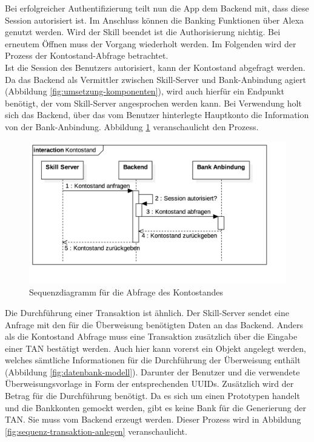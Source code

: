 Bei erfolgreicher Authentifizierung teilt nun die App dem Backend mit, dass diese Session autorisiert ist. Im Anschluss können die Banking Funktionen über Alexa genutzt werden. Wird der Skill beendet ist die Authorisierung nichtig. Bei erneutem Öffnen muss der Vorgang wiederholt werden. Im Folgenden wird der Prozess der Kontostand-Abfrage betrachtet.\\
Ist die Session des Benutzers autorisiert, kann der Kontostand abgefragt werden. Da das Backend als Vermittler zwischen Skill-Server und Bank-Anbindung agiert (\vgl Abbildung \ref{fig:umsetzung-komponenten}), wird auch hierfür ein Endpunkt benötigt, der vom Skill-Server angesprochen werden kann. Bei Verwendung holt sich das Backend, über das vom Benutzer hinterlegte Hauptkonto die Information von der Bank-Anbindung. Abbildung \ref{fig:sequenz-kontostand} veranschaulicht den Prozess.\newpage

\begin{figure}[!htb]
    \centering
    \includegraphics[width=1.0\textwidth]{bilder/4_sequenzKontostand.png}
    \caption{Sequenzdiagramm für die Abfrage des Kontostandes}
    \label{fig:sequenz-kontostand}
\end{figure}

Die Durchführung einer Transaktion ist ähnlich. Der Skill-Server sendet eine Anfrage mit den für die Überweisung benötigten Daten an das Backend. Anders als die Kontostand Abfrage muss eine Transaktion zusätzlich über die Eingabe einer \ac{TAN} bestätigt werden. Auch hier kann vorerst ein Objekt angelegt werden, welches sämtliche Informationen für die Durchführung der Überweisung enthält (\vgl Abbildung \ref{fig:datenbank-modell}). Darunter der Benutzer und die verwendete Überweisungsvorlage in Form der entsprechenden \acp{UUID}. Zusätzlich wird der Betrag für die Durchführung benötigt. Da es sich um einen Prototypen handelt und die Bankkonten gemockt werden, gibt es keine Bank für die Generierung der \ac{TAN}. Sie muss vom Backend erzeugt werden. Dieser Prozess wird in Abbildung \ref{fig:sequenz-transaktion-anlegen} veranschaulicht.\newpage

